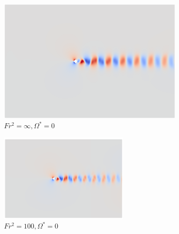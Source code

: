 \begin{figure}   
    \centering
        \begin{subfigure}[b]{0.32\textwidth}
        \centering
        \includegraphics[width=\textwidth]{images/circle/av0fsinf.png}
        \caption{$Fr^2 = \infty, \Omega^{\ast} = 0$}
        \label{fig:av0fsinf}
    \end{subfigure}
    \hfill
    \begin{subfigure}[b]{0.32\textwidth}
        \centering
        \includegraphics[width=\textwidth]{images/circle/av0fr10.png}
        \caption{$Fr^2 = 100, \Omega^{\ast} = 0$}
        \label{fig:av0frs100}
    \end{subfigure}
    \hfill
    \begin{subfigure}[b]{0.32\textwidth}
        \centering

\end{subfigure}
\end{figure}
